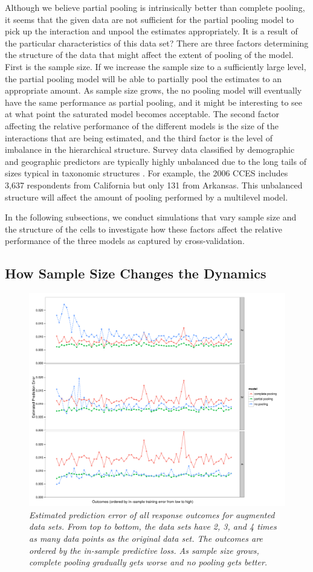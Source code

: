 \documentclass[11pt,article,oneside]{memoir}
\begin{document}
Although we believe partial pooling is intrinsically better than
complete pooling, it seems that the given data are not sufficient for
the partial pooling model to pick up the interaction and unpool the
estimates appropriately. It is a result of the particular
characteristics of this data set? There are three factors determining
the structure of the data that might affect the extent of pooling of the
model. First is the sample size. If we increase the sample size to a
sufficiently large level, the partial pooling model will be able to
partially pool the estimates to an appropriate amount. As sample size
grows, the no pooling model will eventually have the same performance as
partial pooling, and it might be interesting to see at what point the
saturated model becomes acceptable. The second factor affecting the
relative performance of the different models is the size of the
interactions that are being estimated, and the third factor is the level
of imbalance in the hierarchical structure. Survey data classified by
demographic and geographic predictors are typically highly unbalanced
due to the long tails of sizes typical in taxonomic structures
\citep{Mandelbrot:1955}. For example, the 2006 CCES includes 3,637
respondents from California but only 131 from Arkansas. This unbalanced
structure will affect the amount of pooling performed by a multilevel
model.

In the following subsections, we conduct simulations that vary sample
size and the structure of the cells to investigate how these factors
affect the relative performance of the three models as captured by
cross-validation.

\subsection{How Sample Size Changes the
Dynamics}\label{how-sample-size-changes-the-dynamics}

\begin{figure}[p]
  \centering
  \includegraphics[width=.45\textwidth]{outcome234.pdf}
  \caption{\em Estimated prediction error of all response outcomes for augmented
    data sets. From top to bottom, the data sets have 2, 3, and 4 times as many
    data points as the original data set. The outcomes are ordered by the
    in-sample predictive loss. As sample size grows, complete pooling
    gradually gets worse and no pooling gets better.}
  \label{fig:figx234}
\end{figure}
\end{document}
